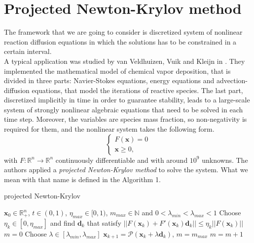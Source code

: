 \section{Projected Newton-Krylov method}
The framework that we are going to consider is discretized system of nonlinear reaction diffusion equations in which the solutions has to be constrained in a certain interval.\\
A typical application was studied by van Veldhuizen, Vuik and Kleijn in \cite{before_MAIN}. They implemented the mathematical model of chemical vapor deposition, that is divided in three parts: Navier-Stokes equations, energy equations and advection-diffusion equations, that model the iterations of reactive species. The last part, discretized implicitly in time in order to guarantee stability, leads to a large-scale system of strongly nonlinear algebraic equations that need to be solved in each time step. Moreover, the variables are species mass fraction, so non-negativity is required for them, and the nonlinear system takes the following form.
\begin{equation*}
\begin{cases}
F(\textbf{x}) = 0\\ \textbf{x} \geq 0, 
\end{cases}
\end{equation*}
with $ F: \mathbb{R}^n \rightarrow \mathbb{R}^n  $ continuously differentiable and with around $10^9$ unknowns.
  The authors applied a \textit{projected Newton-Krylov method} to solve the system. What we mean with that name is defined in the Algorithm 1. \\
\begin{algorithm}
	\caption{projected Newton-Krylov}
	\label{pNK}
	\begin{algorithmic}[1]
		\STATE 	$ \textbf{x}_0 \in \mathbb{R}^{n}_{+} $, $ t \in (0,1) $, $ \eta_{max} \in [0,1) $, $ m_{max} \in \mathbb{N}  $ and $ 0 <  \lambda_{min} < \lambda_{max} < 1$
		\STATE Choose $\eta_k \in [0,\eta_{max}]$ and find $\textbf{d}_k$ that satisfy
		\STATE $ ||F(\textbf{x}_k) + F'(\textbf{x}_k)\textbf{d}_k||\leq \eta_k||F(\textbf{x}_k)|| $
		\STATE $ m = 0 $
		\STATE Choose $ \lambda \in  [\lambda_{min}, \lambda_{max}] $
		\STATE	$ \textbf{x}_{k+1} = \mathcal{P}(\textbf{x}_k + \lambda \textbf{d}_k)$,  $m = m_{max} $
		\ELSE
		\STATE $ m = m + 1$
		\ENDIF
		\ENDWHILE
		\ENDFOR
	\end{algorithmic}
\end{algorithm}
